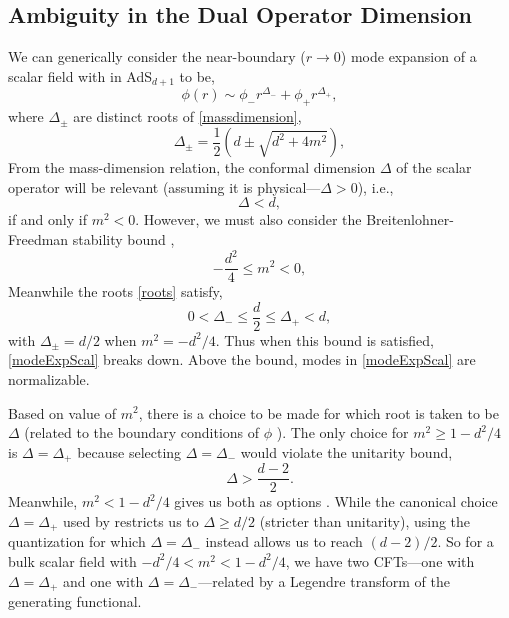 \documentclass[12pt,a4paper]{article}
\begin{document}
\begin{appendices}


\section{Ambiguity in the Dual Operator Dimension}\label{appA}
We can generically consider the near-boundary ($r \to 0$) mode expansion of a scalar field with in AdS$_{d+1}$ to be,
\begin{equation}
\phi(r) \sim \phi_- r^{\Delta_-} + \phi_+ r^{\Delta_+},\label{modeExpScal}
\end{equation}
where $\Delta_{\pm}$ are distinct roots of \eqref{massdimension},
\begin{equation}
\Delta_{\pm} = \frac{1}{2}\left(d \pm \sqrt{d^2 + 4m^2}\right),\label{roots}
\end{equation}
From the mass-dimension relation, the conformal dimension $\Delta$ of the scalar operator will be relevant (assuming it is physical---$\Delta > 0$), i.e.,
\begin{equation}
\Delta < d,
\end{equation}
if and only if $m^2 < 0$. However, we must also consider the Breitenlohner-Freedman stability bound \cite{Breitenlohner:1982bm},
\begin{equation}
-\frac{d^2}{4} \leq m^2 < 0,
\end{equation}
Meanwhile the roots \eqref{roots} satisfy,
\begin{equation}
0 < \Delta_- \leq \frac{d}{2} \leq \Delta_+ < d,
\end{equation}
with $\Delta_\pm = d/2$ when $m^2 = -d^2/4$. Thus when this bound is satisfied, \eqref{modeExpScal} breaks down. Above the bound, modes in \eqref{modeExpScal} are normalizable.

Based on value of $m^2$, there is a choice to be made for which root is taken to be $\Delta$ (related to the boundary conditions of $\phi$ \cite{Minces:1999eg}). The only choice for $m^2 \geq 1-d^2/4$ is $\Delta = \Delta_+$ because selecting $\Delta = \Delta_-$ would violate the unitarity bound,
\begin{equation}
\Delta > \frac{d-2}{2}.
\end{equation}
Meanwhile, $m^2 < 1 - d^2/4$ gives us both as options \cite{Klebanov:1999tb}. While the canonical choice $\Delta = \Delta_+$ used by \cite{Frenkel:2020ysx} restricts us to $\Delta \geq d/2$ (stricter than unitarity), using the quantization for which $\Delta = \Delta_-$ instead allows us to reach $(d-2)/2$. So for a bulk scalar field with $-d^2/4 < m^2 < 1-d^2/4$, we have two CFTs---one with $\Delta = \Delta_+$ and one with $\Delta = \Delta_-$---related by a Legendre transform of the generating functional.


\end{appendices}
\end{document}
